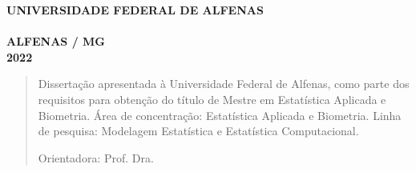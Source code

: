 
\setcounter{page}{0}

	
\onehalfspacing
\thispagestyle{empty}
\begin{center}
	{\textbf{UNIVERSIDADE FEDERAL DE ALFENAS}}\\
	\vspace{6cm}
    {\textbf{\teseauthorcap}}\\
	\vspace{6cm}
    {\textbf{\tesetitlecap}} 
	\vfill
	\textbf{ALFENAS     / MG\\
		2022}
\end{center}



\newpage
\vspace{-0.7cm}
\centerline{\textbf{\teseauthorcap}}
\vspace{3cm}
\begin{singlespace}
\begin{center}
\textbf{\tesetitlecap}
\end{center}
\end{singlespace}
\vspace{3cm}
\begin{flushright}
\begin{minipage}{12cm}
\begin{quote}
\begin{singlespace}
Dissertação apresentada à Universidade Federal de Alfenas, como parte dos requisitos para obtenção do título de Mestre em Estatística Aplicada e Biometria. Área de concentração: Estatística Aplicada e Biometria. Linha de pesquisa: Modelagem Estatística e Estatística Computacional. 

\vspace{0.1cm}
\noindent Orientadora: Prof. Dra. \teseorientador
\end{singlespace}
\end{quote}
\end{minipage}
\end{flushright}


